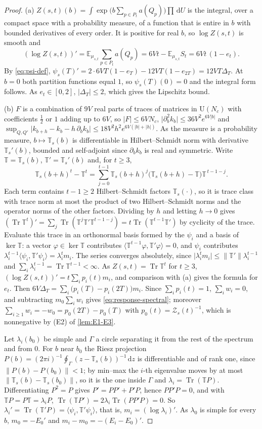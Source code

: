 \documentclass[11pt,a4paper]{amsart}
\theoremstyle{definition}
\theoremstyle{remark}
\numberwithin{equation}{section}
\DeclareMathOperator{\Tr}{Tr}        %
\newcommand{\ip}[2]{\langle #1,#2\rangle}  %
\newcommand{\norm}[1]{\lVert #1\rVert}     %
\newcommand{\abs}[1]{\lvert #1\rvert}      %
\newcommand{\dd}{\,\mathrm{d}}             %
\newcommand{\U}{\mathrm{U}}                %
\newcommand{\TT}{\mathbb{T}}               %
\newcommand{\Zpart}[2]{Z(#1,#2)}           %
\newcommand{\Zc}{\mathcal{Z}}              %
\newcommand{\Zs}[2]{\Zc_{#1}(#2)}          %
\newcommand{\psiT}[2]{\psi_{#1}(#2)}       %
\newcommand{\lzero}{\lambda_0}             %
\begin{document}
\begin{proof}
(a) $\Zpart{s}{t}(b)=\int\exp\bigl(b\sum_{p\in P_t}a(Q_p)\bigr)\prod\dd U$ is the integral, over a compact space with a probability measure, of a function that is entire in $b$ with bounded derivatives of every order. It is positive for real $b$, so $\log\Zpart{s}{t}$ is smooth and
\[
(\log\Zpart{s}{t})'=\mathbb{E}_{\mu_{s,t}}\sum_{p\in P_t}a(Q_p)=6Vt-\mathbb{E}_{\mu_{s,t}}S_t=6Vt\,(1-e_t).
\]
By \eqref{eq:psi-def}, $\psiT{s}{T}'=2\cdot6VT(1-e_T)-12VT(1-e_{2T})=12VT\Delta_T$. At $b=0$ both partition functions equal $1$, so $\psiT{s}{T}(0)=0$ and the integral form follows. As $e_t\in[0,2]$, $\abs{\Delta_T}\le2$, which gives the Lipschitz bound.

(b) $F$ is a combination of $9V$ real parts of traces of matrices in $\U(N_c)$ with coefficients $\frac12$ or $1$ adding up to $6V$, so $\abs{F}\le6VN_c$, $\abs{\partial_b^2k_b}\le36V^2e^{6V\abs{b}}$ and $\sup_{Q,Q'}\abs{k_{b+h}-k_b-h\,\partial_bk_b}\le18V^2h^2e^{6V(\abs{b}+\abs{h})}$. As the measure is a probability measure, $b\mapsto\TT_s(b)$ is differentiable in Hilbert--Schmidt norm with derivative $\TT_s'(b)$, bounded and self-adjoint since $\partial_bk_b$ is real and symmetric. Write $\TT=\TT_s(b)$, $\TT'=\TT_s'(b)$ and, for $t\ge3$,
\[
\TT_s(b+h)^t-\TT^t=\sum_{j=0}^{t-1}\TT_s(b+h)^j\bigl(\TT_s(b+h)-\TT\bigr)\TT^{\,t-1-j}.
\]
Each term contains $t-1\ge2$ Hilbert--Schmidt factors $\TT_s(\cdot)$, so it is trace class with trace norm at most the product of two Hilbert--Schmidt norms and the operator norms of the other factors. Dividing by $h$ and letting $h\to0$ gives $(\Tr\TT^t)'=\sum_j\Tr(\TT^j\TT'\TT^{t-1-j})=t\Tr(\TT^{t-1}\TT')$ by cyclicity of the trace. Evaluate this trace in an orthonormal basis formed by the $\psi_i$ and a basis of $\ker\TT$: a vector $\varphi\in\ker\TT$ contributes $\ip{\TT^{t-1}\varphi}{\TT'\varphi}=0$, and $\psi_i$ contributes $\lambda_i^{t-1}\ip{\psi_i}{\TT'\psi_i}=\lambda_i^tm_i$. The series converges absolutely, since $\abs{\lambda_i^tm_i}\le\norm{\TT'}\lambda_i^{t-1}$ and $\sum_i\lambda_i^{t-1}=\Tr\TT^{t-1}<\infty$. As $\Zpart{s}{t}=\Tr\TT^t$ for $t\ge3$, $(\log\Zpart{s}{t})'=t\sum_ip_i(t)m_i$, and comparison with (a) gives the formula for $e_t$. Then $6V\Delta_T=\sum_i\bigl(p_i(T)-p_i(2T)\bigr)m_i$. Since $\sum_ip_i(t)=1$, $\sum_iw_i=0$, and subtracting $m_0\sum_iw_i$ gives \eqref{eq:response-spectral}; moreover $\sum_{i\ge1}w_i=-w_0=p_0(2T)-p_0(T)$ with $p_0(t)=\Zs{s}{t}^{-1}$, which is nonnegative by (E2) of \cref{lem:E1-E3}.

Let $\lambda_i(b_0)$ be simple and $\Gamma$ a circle separating it from the rest of the spectrum and from $0$. For $b$ near $b_0$ the Riesz projection $P(b)=(2\pi i)^{-1}\oint_\Gamma(z-\TT_s(b))^{-1}\dd z$ is differentiable and of rank one, since $\norm{P(b)-P(b_0)}<1$; by min--max the $i$-th eigenvalue moves by at most $\norm{\TT_s(b)-\TT_s(b_0)}$, so it is the one inside $\Gamma$ and $\lambda_i=\Tr(\TT P)$. Differentiating $P^2=P$ gives $P'=PP'+P'P$, hence $PP'P=0$, and with $\TT P=P\TT=\lambda_iP$, $\Tr(\TT P')=2\lambda_i\Tr(PP'P)=0$. So $\lambda_i'=\Tr(\TT'P)=\ip{\psi_i}{\TT'\psi_i}$, that is, $m_i=(\log\lambda_i)'$. As $\lzero$ is simple for every $b$, $m_0=-E_0'$ and $m_i-m_0=-(E_i-E_0)'$.


\end{proof}
\end{document}
